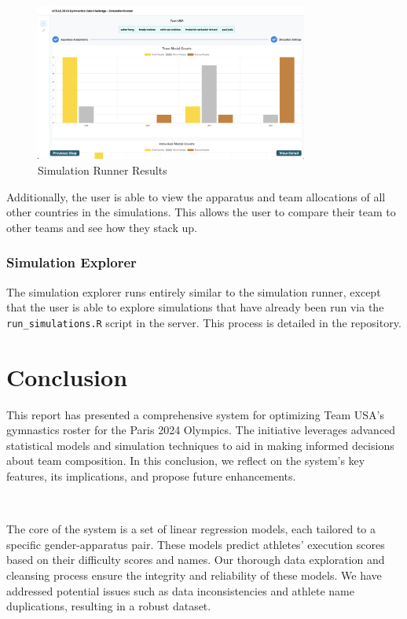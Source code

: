 \documentclass{article}
\begin{document}
\begin{figure}[H]
    \centering
    \includegraphics[width=0.8\textwidth]{./results_viewer.png}
    \caption{Simulation Runner Results}
    \label{fig:sim_results}
\end{figure}

\noindent Additionally, the user is able to view the apparatus and team allocations of all 
other countries in the simulations. This allows the user to compare their team
to other teams and see how they stack up.



\subsubsection{Simulation Explorer}

The simulation explorer runs entirely similar to the simulation runner, except that the user
is able to explore simulations that have already been run via the \texttt{run\_simulations.R} script in the server. This 
process is detailed in the repository.

\section{Conclusion}\label{sec:conclusion}
This report has presented a comprehensive system for optimizing Team USA's 
gymnastics roster for the Paris 2024 Olympics. The initiative leverages 
advanced statistical models and simulation techniques to aid in making informed 
decisions about team composition. In this conclusion, we reflect on the system's 
key features, its implications, and propose future enhancements.

\

\noindent The core of the system is a set of linear regression models, each tailored 
to a specific gender-apparatus pair. These models predict athletes' execution 
scores based on their difficulty scores and names. Our thorough data exploration 
and cleansing process ensure the integrity and reliability of these models. 
We have addressed potential issues such as data inconsistencies and athlete 
name duplications, resulting in a robust dataset. 
\end{document}
